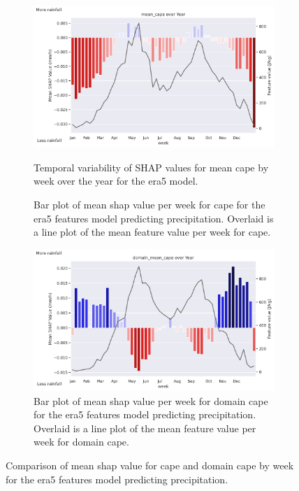 \begin{figure}[ht]
    \centering
    \begin{subfigure}[t]{\textwidth}
        \centering
        \includegraphics[width=\textwidth]{../figures/generated/experiments/obs_precipitation/temporal_corr/obs_precipitation_era5_shap_mean_cape_by_week_over_year.png}
        \caption{Temporal variability of SHAP values for mean \acrshort{cape} by week over the year for the \acrshort{era5} model.}
        \caption{Bar plot of mean \acrshort{shap} value per week for \acrshort{cape} for the \acrshort{era5} features model predicting precipitation. Overlaid is a line plot of the mean feature value per week for \acrshort{cape}.}
        \label{fig:obs_precipitation_era5_shap_mean_cape_by_week_over_year}
    \end{subfigure}
    \vspace{1em}
    \begin{subfigure}[t]{\textwidth}
        \centering
        \includegraphics[width=\textwidth]{../figures/generated/experiments/obs_precipitation/temporal_corr/obs_precipitation_era5_shap_domain_mean_cape_by_week_over_year.png}
        \caption{Bar plot of mean \acrshort{shap} value per week for domain \acrshort{cape} for the \acrshort{era5} features model predicting precipitation. Overlaid is a line plot of the mean feature value per week for domain \acrshort{cape}.}
        \label{fig:obs_precipitation_era5_shap_domain_mean_cape_by_week_over_year}
    \end{subfigure}
    \caption{Comparison of mean \acrshort{shap} value for \acrshort{cape} and domain \acrshort{cape} by week for the \acrshort{era5} features model predicting precipitation.}
    \label{fig:obs_precipitation_cape_by_week_over_year}
\end{figure}

